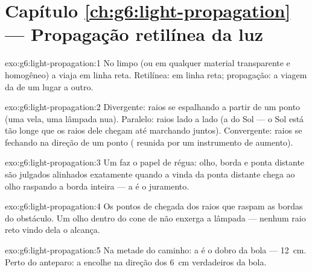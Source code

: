 \section*{Capítulo \ref{ch:g6:light-propagation} --- Propagação retilínea da luz}

\begin{solution}{exo:g6:light-propagation:1}
No  limpo (ou em qualquer material transparente e homogêneo) a 
viaja em linha reta. Retilínea: em linha reta; propagação: a viagem
da  de um lugar a outro.
\end{solution}

\begin{solution}{exo:g6:light-propagation:2}
Divergente: raios se espalhando a partir de um ponto (uma vela, uma
lâmpada nua). Paralelo: raios lado a lado (a  do Sol --- o Sol
está tão longe que os raios dele chegam até  marchando juntos).
Convergente: raios se fechando na direção de um ponto ( reunida
por um instrumento de aumento).
\end{solution}

\begin{solution}{exo:g6:light-propagation:3}
Um  faz o papel de régua: olho, borda e ponta distante são
julgados alinhados exatamente quando a  vinda da ponta distante
chega ao olho raspando a borda inteira --- a  é o
juramento.
\end{solution}

\begin{solution}{exo:g6:light-propagation:4}
Os pontos de chegada dos raios que raspam as bordas do obstáculo. Um
olho dentro do cone de  não enxerga a lâmpada --- nenhum raio
reto vindo dela o alcança.
\end{solution}

\begin{solution}{exo:g6:light-propagation:5}
Na metade do caminho: a  é o dobro da bola --- \qty{12}{cm}.
Perto do anteparo: a  encolhe na direção dos \qty{6}{cm}
verdadeiros da bola.
\end{solution}

